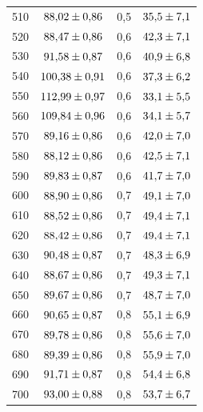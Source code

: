 \begin{longtable}{c c c c}
    510  & $\num{ 88.02+-0.86}$ & 0,5 & $\num{35.5+-7.1}$ \\
    520  & $\num{ 88.47+-0.86}$ & 0,6 & $\num{42.3+-7.1}$ \\
    530  & $\num{ 91.58+-0.87}$ & 0,6 & $\num{40.9+-6.8}$ \\
    540  & $\num{100.38+-0.91}$ & 0,6 & $\num{37.3+-6.2}$ \\
    550  & $\num{112.99+-0.97}$ & 0,6 & $\num{33.1+-5.5}$ \\
    560  & $\num{109.84+-0.96}$ & 0,6 & $\num{34.1+-5.7}$ \\
    570  & $\num{ 89.16+-0.86}$ & 0,6 & $\num{42.0+-7.0}$ \\
    580  & $\num{ 88.12+-0.86}$ & 0,6 & $\num{42.5+-7.1}$ \\
    590  & $\num{ 89.83+-0.87}$ & 0,6 & $\num{41.7+-7.0}$ \\
    600  & $\num{ 88.90+-0.86}$ & 0,7 & $\num{49.1+-7.0}$ \\
    610  & $\num{ 88.52+-0.86}$ & 0,7 & $\num{49.4+-7.1}$ \\
    620  & $\num{ 88.42+-0.86}$ & 0,7 & $\num{49.4+-7.1}$ \\
    630  & $\num{ 90.48+-0.87}$ & 0,7 & $\num{48.3+-6.9}$ \\
    640  & $\num{ 88.67+-0.86}$ & 0,7 & $\num{49.3+-7.1}$ \\
    650  & $\num{ 89.67+-0.86}$ & 0,7 & $\num{48.7+-7.0}$ \\
    660  & $\num{ 90.65+-0.87}$ & 0,8 & $\num{55.1+-6.9}$ \\
    670  & $\num{ 89.78+-0.86}$ & 0,8 & $\num{55.6+-7.0}$ \\
    680  & $\num{ 89.39+-0.86}$ & 0,8 & $\num{55.9+-7.0}$ \\
    690  & $\num{ 91.71+-0.87}$ & 0,8 & $\num{54.4+-6.8}$ \\
    700  & $\num{ 93.00+-0.88}$ & 0,8 & $\num{53.7+-6.7}$ \\
    \bottomrule
\end{longtable}